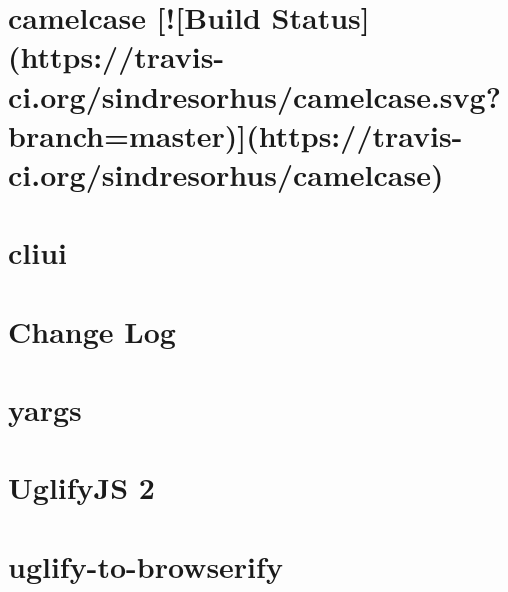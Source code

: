 \documentclass[twoside]{book}
\newcommand{\+}{\discretionary{\mbox{\scriptsize$\hookleftarrow$}}{}{}}
\begin{document}
\chapter{camelcase \mbox{[}!\mbox{[}Build Status\mbox{]}(https\+://travis-\/ci.org/sindresorhus/camelcase.svg?branch=master)\mbox{]}(https\+://travis-\/ci.org/sindresorhus/camelcase)}
\label{md__c_1_workspace_demo_src_main_script_node_modules_uglify-js_node_modules_camelcase_readme}

\chapter{cliui}
\label{md__c_1_workspace_demo_src_main_script_node_modules_uglify-js_node_modules_cliui__r_e_a_d_m_e}

\chapter{Change Log}
\label{md__c_1_workspace_demo_src_main_script_node_modules_uglify-js_node_modules_yargs__c_h_a_n_g_e_l_o_g}

\chapter{yargs}
\label{md__c_1_workspace_demo_src_main_script_node_modules_uglify-js_node_modules_yargs__r_e_a_d_m_e}

\chapter{Uglify\+JS 2}
\label{md__c_1_workspace_demo_src_main_script_node_modules_uglify-js__r_e_a_d_m_e}

\chapter{uglify-\/to-\/browserify}
\label{md__c_1_workspace_demo_src_main_script_node_modules_uglify-to-browserify__r_e_a_d_m_e}

\end{document}
